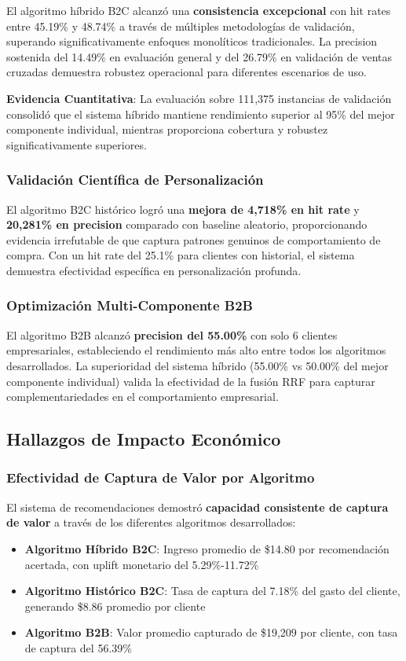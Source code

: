 \documentclass[twocolumn]{article}
\begin{document}
El algoritmo híbrido B2C alcanzó una \textbf{consistencia excepcional} con hit rates entre 45.19\% y 48.74\% a través de múltiples metodologías de validación, superando significativamente enfoques monolíticos tradicionales. La precision sostenida del 14.49\% en evaluación general y del 26.79\% en validación de ventas cruzadas demuestra robustez operacional para diferentes escenarios de uso.

\textbf{Evidencia Cuantitativa}: La evaluación sobre 111,375 instancias de validación consolidó que el sistema híbrido mantiene rendimiento superior al 95\% del mejor componente individual, mientras proporciona cobertura y robustez significativamente superiores.

\subsubsection{Validación Científica de Personalización}

El algoritmo B2C histórico logró una \textbf{mejora de 4,718\% en hit rate} y \textbf{20,281\% en precision} comparado con baseline aleatorio, proporcionando evidencia irrefutable de que captura patrones genuinos de comportamiento de compra. Con un hit rate del 25.1\% para clientes con historial, el sistema demuestra efectividad específica en personalización profunda.

\subsubsection{Optimización Multi-Componente B2B}

El algoritmo B2B alcanzó \textbf{precision del 55.00\%} con solo 6 clientes empresariales, estableciendo el rendimiento más alto entre todos los algoritmos desarrollados. La superioridad del sistema híbrido (55.00\% vs 50.00\% del mejor componente individual) valida la efectividad de la fusión RRF para capturar complementariedades en el comportamiento empresarial.

\subsection{Hallazgos de Impacto Económico}

\subsubsection{Efectividad de Captura de Valor por Algoritmo}

El sistema de recomendaciones demostró \textbf{capacidad consistente de captura de valor} a través de los diferentes algoritmos desarrollados:
\begin{itemize}
    \item \textbf{Algoritmo Híbrido B2C}: Ingreso promedio de \$14.80 por recomendación acertada, con uplift monetario del 5.29\%-11.72\%
    \item \textbf{Algoritmo Histórico B2C}: Tasa de captura del 7.18\% del gasto del cliente, generando \$8.86 promedio por cliente
    \item \textbf{Algoritmo B2B}: Valor promedio capturado de \$19,209 por cliente, con tasa de captura del 56.39\%
\end{itemize}
\end{document}
